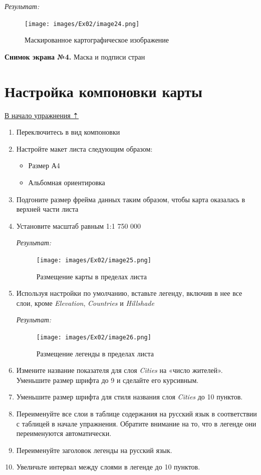 \documentclass[12pt,]{book}
\providecommand{\tightlist}{%
  \setlength{\itemsep}{0pt}\setlength{\parskip}{0pt}}
\begin{document}
\emph{Результат:}

\begin{figure}
\centering
\texttt{[image: images/Ex02/image24.png]}
\caption{Маскированное картографическое изображение}
\end{figure}

\textbf{Снимок экрана №4.} Маска и подписи стран

\hypertarget{map-design-general-layout}{%
\section{Настройка компоновки карты}\label{map-design-general-layout}}

\protect\hyperlink{map-design-general}{В начало упражнения ⇡}

\begin{enumerate}
\def\labelenumi{\arabic{enumi}.}
\item
  Переключитесь в вид компоновки
\item
  Настройте макет листа следующим образом:

  \begin{itemize}
  \tightlist
  \item
    Размер А4
  \item
    Альбомная ориентировка
  \end{itemize}
\item
  Подгоните размер фрейма данных таким образом, чтобы карта оказалась в верхней части листа
\item
  Установите масштаб равным 1:1 750 000

  \emph{Результат:}

  \begin{figure}
  \centering
  \texttt{[image: images/Ex02/image25.png]}
  \caption{Размещение карты в пределах листа}
  \end{figure}
\item
  Используя настройки по умолчанию, вставьте легенду, включив в нее все слои, кроме \emph{Elevation}, \emph{Countries} и \emph{Hillshade}

  \emph{Результат:}

  \begin{figure}
  \centering
  \texttt{[image: images/Ex02/image26.png]}
  \caption{Размещение легенды в пределах листа}
  \end{figure}
\item
  Измените название показателя для слоя \emph{Cities} на «число жителей». Уменьшите размер шрифта до 9 и сделайте его курсивным.
\item
  Уменьшите размер шрифта для стиля названия слоя \emph{Cities} до 10 пунктов.
\item
  Переименуйте все слои в таблице содержания на русский язык в соответствии с таблицей в начале упражнения. Обратите внимание на то, что в легенде они переименуются автоматически.
\item
  Переименуйте заголовок легенды на русский язык.
\item
  Увеличьте интервал между слоями в легенде до 10 пунктов.


\end{enumerate}
\end{document}
